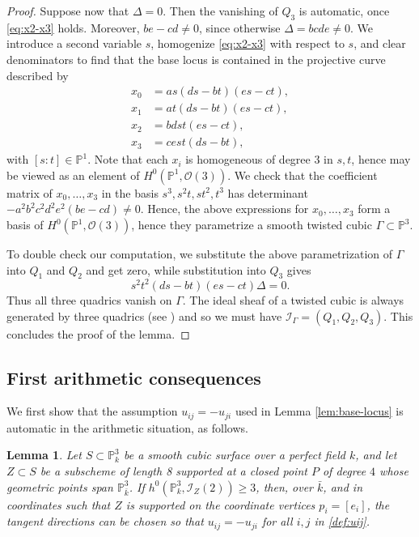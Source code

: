\documentclass[a4paper,11pt]{amsart}
\numberwithin{equation}{section}
\newtheorem{lemma}[theorem]{Lemma}
\theoremstyle{definition}
\theoremstyle{remark}
\newcommand{\PP}{\mathbb P}
\newcommand{\CP}{\PP}
\begin{document}
\begin{proof}
Suppose now that $\Delta=0$. 
Then the vanishing of $Q_3$ is automatic, once \eqref{eq:x2-x3} holds.
Moreover, $be-cd\ne 0$, since otherwise $\Delta=bcde\ne 0$.
We introduce a second variable $s$, homogenize \eqref{eq:x2-x3} with respect to $s$, and clear denominators to find that the base locus is contained in the projective curve described by
\begin{align*}
  x_0&=a s(ds-bt)(es-ct),\\
  x_1&=a t(ds-bt)(es-ct),\\
  x_2&=bdst(es-ct),\\
  x_3&=cest(ds-bt),
\end{align*}
with $[s:t]\in \CP^1$. 
Note that each $x_i$ is homogeneous of degree $3$ in $s,t$, hence may be viewed as an element of $H^0(\CP^1,\mathcal O(3))$.
We check that the coefficient matrix of $x_0,\dots ,x_3$ in the basis $s^3,s^2t,st^2,t^3$ has determinant $ -a^2b^2c^2d^2e^2(be-cd)\ne 0$.
Hence, the above expressions for $x_0,\dots ,x_3$ form a basis of $H^0(\CP^1,\mathcal O(3))$, hence they parametrize a smooth twisted cubic $\Gamma\subset \CP^3$.

To double check our computation, we substitute the above parametrization of $\Gamma$ into $Q_1$ and $Q_2$ and get zero, while substitution into $Q_3$ gives
\[
  s^2t^2(ds-bt)(es-ct)\Delta=0.
\]
Thus all three quadrics vanish on $\Gamma$.
The ideal sheaf of a twisted cubic is always generated by three quadrics (see \cite[Proposition~6.1]{eisenbud-syzygies}) and so we must have $\mathcal I_\Gamma=(Q_1,Q_2,Q_3)$.
This concludes the proof of the lemma.
\end{proof}


\subsection{First arithmetic consequences}

We first show that the assumption $u_{ij}=-u_{ji}$ used in Lemma \ref{lem:base-locus} is automatic in the arithmetic situation, as follows.

\begin{lemma} \label{lem:uij=-uji}
Let $S\subset\mathbb P^3_k$ be a smooth cubic surface over a perfect field $k$, and let $Z\subset S$ be a
subscheme of length 8 supported at a closed point $P$ of degree $4$ whose geometric points span $\CP^3_{\bar k}$.
If $h^0(\mathbb P^3_k,\mathcal I_Z(2))\geq 3$, then, over $\bar k$, and in coordinates such that $Z$ is supported on the coordinate vertices $p_i=[e_i]$, the tangent directions can be chosen so that $u_{ij}=-u_{ji}$ for all $i,j$ in \eqref{def:uij}.
\end{lemma}
\end{document}
